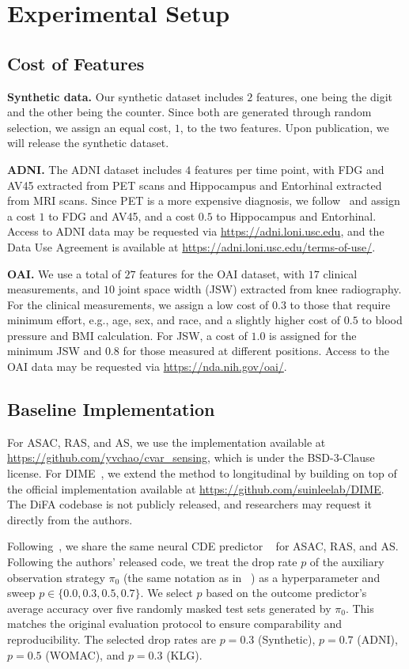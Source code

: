 \section{Experimental Setup} \label{appendex:experiment_setup}
\subsection{Cost of Features} \label{sec:cost}
\textbf{Synthetic data.} Our synthetic dataset includes $2$ features, one being the digit and the other being the counter. Since both are generated through random selection, we assign an equal cost, $1$, to the two features. Upon publication, we will release the synthetic dataset. 

\textbf{ADNI.} The ADNI dataset includes $4$ features per time point, with FDG and AV45 extracted from PET scans and Hippocampus and Entorhinal extracted from MRI scans. Since PET is a more expensive diagnosis, we follow~\citet{qin2024risk} and assign a cost $1$ to FDG and AV45, and a cost $0.5$ to Hippocampus and Entorhinal. Access to ADNI data may be requested via \url{https://adni.loni.usc.edu}, and the Data Use Agreement is available at \url{https://adni.loni.usc.edu/terms-of-use/}.

\textbf{OAI.} We use a total of $27$ features for the OAI dataset, with $17$ clinical measurements, and $10$ joint space width (JSW) extracted from knee radiography. For the clinical measurements, we assign a low cost of $0.3$ to those that require minimum effort, e.g., age, sex, and race, and a slightly higher cost of $0.5$ to blood pressure and BMI calculation. For JSW, a cost of $1.0$ is assigned for the minimum JSW and $0.8$ for those measured at different positions. Access to the OAI data may be requested via \url{https://nda.nih.gov/oai/}.


\subsection{Baseline Implementation} \label{sec:baseline}
For ASAC, RAS, and AS, we use the implementation available at \url{https://github.com/yvchao/cvar_sensing}, which is under the BSD-3-Clause license. For DIME~\citep{gadgil2023estimating}, we extend the method to longitudinal by building on top of the official implementation available at \url{https://github.com/suinleelab/DIME}. The DiFA codebase is not publicly released, and researchers may request it directly from the authors.

Following~\citet{qin2024risk}, we share the same neural CDE predictor ~\citep{kidger2020neural} for ASAC, RAS, and AS. Following the authors' released code, we treat the drop rate $p$ of the auxiliary observation strategy $\pi_0$ (the same notation as in ~\citet{qin2024risk}) as a hyperparameter and sweep $p \in \{0.0, 0.3, 0.5, 0.7\}$. We select $p$ based on the outcome predictor's average accuracy over five randomly masked test sets generated by $\pi_0$. This matches the original evaluation protocol to ensure comparability and reproducibility. The selected drop rates are $p=0.3$ (Synthetic), $p=0.7$ (ADNI), $p=0.5$ (WOMAC), and $p=0.3$ (KLG).

